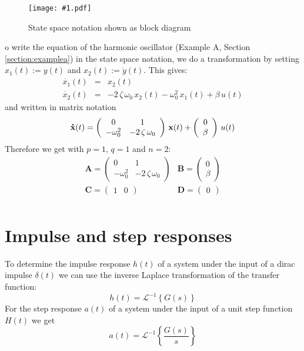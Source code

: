\documentclass[a4paper,12pt]{article}
\newcommand{\Fig}[4]{%
\begin{figure}[htb]%
\begin{center}%
\texttt{[image: \#1.pdf]}%
\end{center}%
\caption{#3\label{fig:#1}}%
\end{figure}%
}
\renewcommand{\Vec}[1]{{\bf #1}}
\newcommand{\Mat}[1]{\mathbf{#1}}
\newcommand{\Section}[2]{\section{#2}\label{section:#1}}
\newcommand{\SRef}[1]{Section \ref{section:#1}}
\begin{document}
\Fig{statespace}{0.8}{State space notation shown as block diagram}

To write the equation of the harmonic oscillator (Example A, \SRef{examplea}) in the state space notation, we do a transformation by setting $x_1(t):=y(t)$ and $x_2(t):=\dot{y}(t)$. This gives:
\begin{eqnarray}
	\dot{x_1}(t)&=&x_2(t)\\
	\dot{x_2}(t)&=&-2\,\zeta\,\omega_0\,x_2(t)-\omega_0^2\,x_1(t)+\beta\,u(t)
\end{eqnarray}
and written in matrix notation
\begin{equation}
\Vec{\dot{x}}(t)=\left(\begin{array}{cc}0 & 1\\-\omega_0^2 & -2\,\zeta\,\omega_0\end{array}\right)\,\Vec{x}(t)+\left(\begin{array}{c}0\\\beta\end{array}\right)\,u(t)
\end{equation}
Therefore we get with $p=1$, $q=1$ and $n=2$:
\begin{equation}
\begin{array}{ll}
	\Mat{A}=\left(\begin{array}{cc}
		0 & 1\\
		-\omega_0^2 & -2\,\zeta\,\omega_0
	\end{array}\right) &
	\Mat{B}=\left(\begin{array}{c}
		0\\
		\beta
	\end{array}\right)\\[4ex]
	\Mat{C}=\left(\begin{array}{cc}
		1 & 0
	\end{array}\right) &
	\Mat{D}=\left(\begin{array}{c}
		0
	\end{array}\right)\\
\end{array}
\end{equation}

\Section{impulsestep}{Impulse and step responses}

To determine the impulse response $h(t)$ of a system under the input of a dirac impulse $\delta(t)$ we can use the inverse Laplace transformation of the transfer function:
\begin{equation}
h(t)=\mathcal{L}^{-1}\left\{G(s)\right\}
\end{equation}
For the step response $a(t)$ of a system under the input of a unit step function $H(t)$ we get
\begin{equation}
a(t)=\mathcal{L}^{-1}\left\{\frac{G(s)}{s}\right\}
\end{equation}
\end{document}
